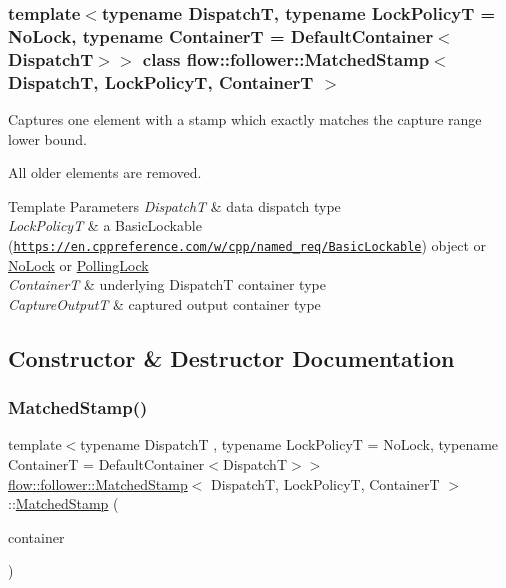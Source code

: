 \subsubsection*{template$<$typename DispatchT, typename Lock\+PolicyT = No\+Lock, typename ContainerT = Default\+Container$<$\+Dispatch\+T$>$$>$\newline
class flow\+::follower\+::\+Matched\+Stamp$<$ Dispatch\+T, Lock\+Policy\+T, Container\+T $>$}

Captures one element with a stamp which exactly matches the capture range lower bound. 

All older elements are removed.


\begin{DoxyTemplParams}{Template Parameters}
{\em DispatchT} & data dispatch type \\
\hline
{\em Lock\+PolicyT} & a Basic\+Lockable (\href{https://en.cppreference.com/w/cpp/named_req/BasicLockable}{\tt https\+://en.\+cppreference.\+com/w/cpp/named\+\_\+req/\+Basic\+Lockable}) object or \hyperlink{structflow_1_1_no_lock}{No\+Lock} or \hyperlink{structflow_1_1_polling_lock}{Polling\+Lock} \\
\hline
{\em ContainerT} & underlying {\ttfamily DispatchT} container type \\
\hline
{\em Capture\+OutputT} & captured output container type \\
\hline
\end{DoxyTemplParams}


\subsection{Constructor \& Destructor Documentation}
\mbox{\label{classflow_1_1follower_1_1_matched_stamp_a6ae585814427bb48fb80b8b21922117c}} 
\subsubsection{\texorpdfstring{Matched\+Stamp()}{MatchedStamp()}}
{\footnotesize\ttfamily template$<$typename DispatchT , typename Lock\+PolicyT  = No\+Lock, typename ContainerT  = Default\+Container$<$\+Dispatch\+T$>$$>$ \\
\hyperlink{classflow_1_1follower_1_1_matched_stamp}{flow\+::follower\+::\+Matched\+Stamp}$<$ DispatchT, Lock\+PolicyT, ContainerT $>$\+::\hyperlink{classflow_1_1follower_1_1_matched_stamp}{Matched\+Stamp} (\begin{DoxyParamCaption}\item[{const ContainerT \&}]{container }\end{DoxyParamCaption})\hspace{0.3cm}{\ttfamily [explicit]}}



